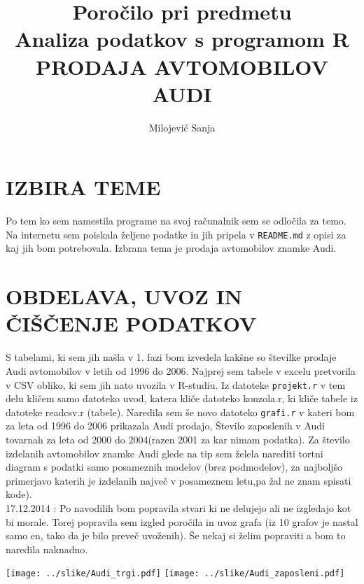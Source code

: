 \documentclass[11pt,a4paper]{article}
\begin{document}
\title{Poročilo pri predmetu \\
Analiza podatkov s programom R\\
PRODAJA AVTOMOBILOV AUDI}
\author{Milojević Sanja}
\maketitle

\section{IZBIRA TEME}
Po tem ko sem namestila programe na svoj računalnik sem se odločila za temo. Na internetu sem poiskala željene podatke in jih pripela v \verb|README.md| z opisi za kaj jih bom potrebovala. Izbrana tema je prodaja avtomobilov znamke Audi.

\section{OBDELAVA, UVOZ IN ČIŠČENJE PODATKOV}
S tabelami, ki sem jih našla v 1. fazi bom izvedela kakšne so številke prodaje Audi avtomobilov v letih od 1996 do 2006. Najprej sem tabele v excelu pretvorila v CSV obliko, ki sem jih nato uvozila v R-studiu. Iz datoteke \verb|projekt.r| v tem delu kličem samo datoteko uvod, katera kliče datoteko konzola.r, ki kliče tabele iz datoteke readcsv.r (tabele).
Naredila sem še novo datoteko \verb|grafi.r| v kateri bom za leta od 1996 do 2006 prikazala Audi prodajo, Število zaposlenih v Audi tovarnah za leta od 2000 do 2004(razen 2001 za kar nimam podatka). Za število izdelanih avtomobilov znamke Audi glede na tip sem želela narediti tortni diagram s podatki samo posameznih modelov (brez podmodelov), za najboljšo primerjavo katerih je izdelanih največ v posameznem letu,pa žal ne znam spisati kode).\\
17.12.2014 : Po navodilih bom popravila stvari ki ne delujejo ali ne izgledajo kot bi morale. Torej popravila sem izgled poročila in uvoz grafa (iz 10 grafov je nastal samo en, tako da je bilo preveč uvoženih). Še nekaj si želim popraviti a bom to naredila naknadno.

\texttt{[image: ../slike/Audi\_trgi.pdf]}
\texttt{[image: ../slike/Audi\_zaposleni.pdf]}
\end{document}
